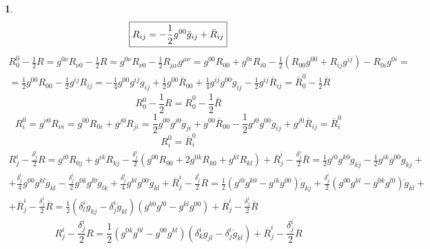 \documentclass[12pt]{article}
\theoremstyle{definition}
\newtheorem{zad}{}[section]
\begin{document}
\begin{zad}
\begin{equation}
    \boxed{R_{ij}=-\frac{1}{2}g^{00}\ddot{g}_{ij}+\Bar{R}_{ij}}
\end{equation}
\begin{multline}
    R_0^0-\frac{1}{2}R=g^{0\nu}R_{\nu0}-\frac{1}{2}R=g^{0\nu}R_{\nu0}-\frac{1}{2}R_{\mu\nu}g^{\mu\nu}=g^{00}R_{00}+g^{0i}R_{i0}-\frac{1}{2}(R_{00}g^{00}+R_{ij}g^{ij})-R_{0i}g^{0i}=\\=\frac12g^{00}R_{00}-\frac{1}{2}g^{ij}R_{ij}=-\frac{1}{4}g^{00}g^{ij}\ddot{g}_{ij}+\frac{1}{2}g^{00}\overline{R}_{00}+\frac{1}{4}g^{ij}g^{00}\ddot{g}_{ij}-\frac{1}{2}g^{ij}\overline{R}_{ij}=\overline{R}_0^0-\frac{1}{2}\overline{R}
\end{multline}
\begin{equation}
    \boxed{R_0^0-\frac{1}{2}R=\overline{R}_0^0-\frac{1}{2}\overline{R}}
\end{equation}
\begin{equation}
    R_i^0=g^{\nu0}R_{\nu i}=g^{00}R_{0i}+g^{j0}R_{ji}=\frac{1}{2}g^{00}g^{j0}\ddot{g}_{ji}+g^{00}\overline{R}_{00}-\frac{1}{2}g^{j0}g^{00}\ddot{g}_{ij}+g^{j0}\overline{R}_{ij}=\overline{R}^0_i
\end{equation}
\begin{equation}
    \boxed{R^0_i=\overline{R}^0_i}
\end{equation}
\begin{multline}
    R_j^i-\frac{\delta_j^i}{2}R=g^{i0}R_{0j}+g^{ik}R_{kj}-\frac{\delta^i_j}{2}(g^{00}R_{00}+2g^{0k}R_{k0}+g^{kl}R_{kl})+\overline{R}^i_j-\frac{\delta^i_j}{2}\overline{R}=\frac{1}{2}g^{i0}g^{k0}\ddot{g}_{kj}-\frac{1}{2}g^{ik}g^{00}\ddot{g}_{kj}+\\+\frac{\delta^i_j}{4}g^{00}g^{kl}\ddot{g}_{kl}-\frac{\delta^i_j}{2}g^{0k}g^{l0}\ddot{g}_{lk}+\frac{\delta^i_j}{4}g^{kl}g^{00}\ddot{g}_{kl}+\overline{R}^i_j-\frac{\delta^i_j}{2}\overline{R}=\frac{1}{2}(g^{i0}g^{k0}-g^{ik}g^{00})\ddot{g}_{kj}+\frac{\delta^i_j}{2}(g^{00}g^{kl}-g^{0k}g^{l0})\ddot{g}_{kl}+\\+\overline{R}^i_j-\frac{\delta^i_j}{2}\overline{R}=\frac{1}{2}(\delta^i_l\ddot{g}_{kj}-\delta^i_j\ddot{g}_{kl})(g^{k0}g^{l0}-g^{kl}g^{00})+\overline{R}^i_j-\frac{\delta^i_j}{2}\overline{R}
\end{multline}
\begin{equation}
    \boxed{R^i_j-\frac{\delta^i_j}{2}R=\frac{1}{2}(g^{0k}g^{0l}-g^{00}g^{kl})(\delta^i_k\ddot{g}_{jl}-\delta^i_j\ddot{g}_{kl})+\overline{R}^i_j-\frac{\delta^i_j}{2}\overline{R}}
\end{equation}
\end{zad}
\end{document}

